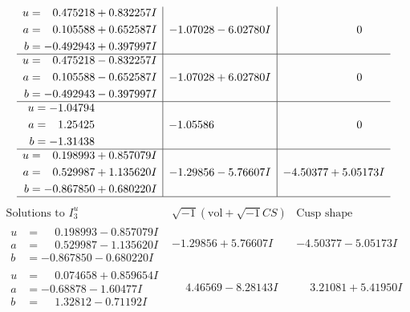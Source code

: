 \documentclass[1p]{elsarticle_modified}
\theoremstyle{definition}
\newcommand{\I}{\sqrt{-1}}
\begin{document}
$$\begin{array}{c|c|c}
\begin{aligned}
u &= \phantom{-}0.475218 + 0.832257 I \\
a &= \phantom{-}0.105588 + 0.652587 I \\
b &= -0.492943 + 0.397997 I\end{aligned}
 & -1.07028 - 6.02780 I & \phantom{-0.000000 } 0 \\ \hline\begin{aligned}
u &= \phantom{-}0.475218 - 0.832257 I \\
a &= \phantom{-}0.105588 - 0.652587 I \\
b &= -0.492943 - 0.397997 I\end{aligned}
 & -1.07028 + 6.02780 I & \phantom{-0.000000 } 0 \\ \hline\begin{aligned}
u &= -1.04794\phantom{ +0.000000I} \\
a &= \phantom{-}1.25425\phantom{ +0.000000I} \\
b &= -1.31438\phantom{ +0.000000I}\end{aligned}
 & -1.05586\phantom{ +0.000000I} & \phantom{-0.000000 } 0 \\ \hline\begin{aligned}
u &= \phantom{-}0.198993 + 0.857079 I \\
a &= \phantom{-}0.529987 + 1.135620 I \\
b &= -0.867850 + 0.680220 I\end{aligned}
 & -1.29856 - 5.76607 I & -4.50377 + 5.05173 I\\
 \hline 
 \end{array}$$\newpage$$\begin{array}{c|c|c}  
\text{Solutions to }I^u_{3}& \I (\text{vol} + \sqrt{-1}CS) & \text{Cusp shape}\\
 \hline 
\begin{aligned}
u &= \phantom{-}0.198993 - 0.857079 I \\
a &= \phantom{-}0.529987 - 1.135620 I \\
b &= -0.867850 - 0.680220 I\end{aligned}
 & -1.29856 + 5.76607 I & -4.50377 - 5.05173 I \\ \hline\begin{aligned}
u &= \phantom{-}0.074658 + 0.859654 I \\
a &= -0.68878 - 1.60477 I \\
b &= \phantom{-}1.32812 - 0.71192 I\end{aligned}
 & \phantom{-}4.46569 - 8.28143 I & \phantom{-}3.21081 + 5.41950 I \\ \hline\begin{aligned}

\end{aligned}
\end{array}$$
\end{document}
